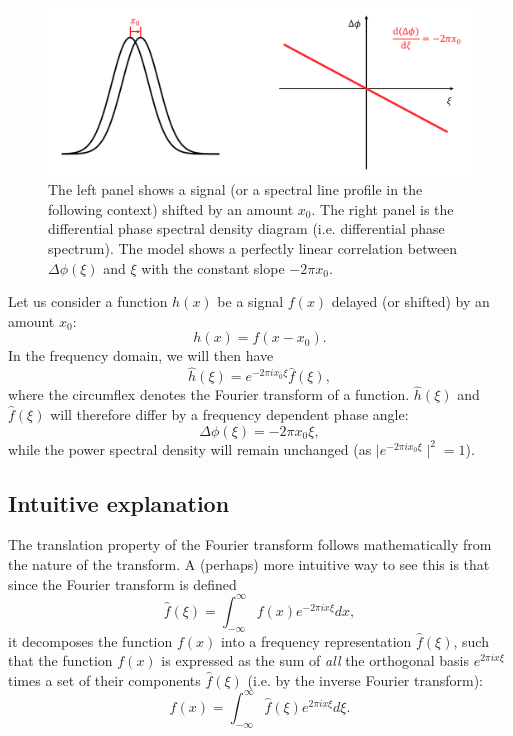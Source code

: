 \begin{figure}[tbp]
\centering
\includegraphics[width = 0.99 \linewidth]
{./Figures/Methods/FT.png}
\caption[Translation property of Fourier transform]
{The left panel shows a signal (or a spectral line profile in the following context) shifted by an amount $x_0$. 
The right panel is the differential phase spectral density diagram (i.e. differential phase spectrum). 
The model shows a perfectly linear correlation 
between $\Delta \phi(\xi)$ and $\xi$ with the constant slope $-2 \pi x_0$.}
\label{fig:FT}
\end{figure} 

Let us consider a function $h(x)$ be a signal $f(x)$ delayed (or shifted) by an amount $x_0$:
\begin{equation}
	h(x) = f(x-x_0).
\label{eq:FT1}
\end{equation}
In the frequency domain, we will then have 
\begin{equation}
	\hat{h}(\xi) = e^{-2 \pi ix_0 \xi} \hat{f}(\xi),
\label{eq:FT2}
\end{equation}
where the circumflex denotes the Fourier transform of a function. $\hat{h}(\xi)$ and $\hat{f}(\xi)$ 
will therefore differ by a frequency dependent phase angle: 
\begin{equation}
	\Delta \phi(\xi) = -2 \pi x_0 \xi,
\label{eq:PhaseShift}
\end{equation}
while the power spectral density will remain unchanged (as $\mid e^{-2 \pi ix_0 \xi}\mid ^2 = 1$).



\subsection{Intuitive explanation}

The translation property of the Fourier transform follows mathematically from the nature of the transform. 
A (perhaps) more intuitive way to see this is that since the Fourier transform is defined 
\begin{equation}
	\hat{f}(\xi) = \int_{-\infty}^{\infty} f(x) e^{-2 \pi ix \xi} dx, 
\label{eq:FT3}
\end{equation}
it decomposes the function $f(x)$ into a frequency representation $\hat{f}(\xi)$, such that the function $f(x)$ is expressed  
as the sum of \textit{all} the orthogonal basis $e^{2 \pi ix \xi}$ times a set of their components $\hat{f}(\xi)$ (i.e.
by the inverse Fourier transform):
\begin{equation}
	f(x) = \int_{-\infty}^{\infty} \hat{f}(\xi) e^{2 \pi ix \xi} d\xi. 
\end{equation}

